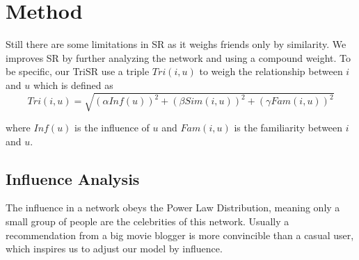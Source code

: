 \documentclass{article}
\begin{document}
\section{Method}
\label{method}
Still there are some limitations in SR as it weighs friends only by similarity. 
We improves SR by further analyzing the network and using a compound weight. To be specific, 
our TriSR use a triple $Tri(i, u)$ to weigh the relationship between $i$ and $u$ which is defined as \\
\begin{equation}
  Tri(i, u) = \sqrt{(\alpha {Inf}(u))^2 + (\beta {Sim}(i, u))^2 + (\gamma {Fam}(i, u))^2 }
\end{equation}

where ${Inf}(u)$ is the influence of $u$ and $Fam(i, u)$ is the familiarity between $i$ and $u$. 
\subsection{Influence Analysis}

The influence in a network obeys the Power Law Distribution, 
meaning only a small group of people are the celebrities of this network.
Usually a recommendation from a big movie blogger is more convincible than a casual user, 
which inspires us to adjust our model by influence.
\end{document}

